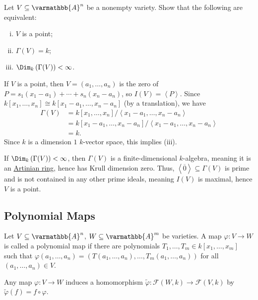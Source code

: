 \documentclass[10pt]{mypackage}
\renewcommand*{\mathbb}[1]{\varmathbb{#1}}
\newcommand{\A}{\mathbb{A}}
\begin{document}
\begin{exercise}[Exercise 2.4]
  Let $V\subseteq \A^n$ be a nonempty variety. Show that the following are equivalent:
  \begin{enumerate}[(i)]
    \item $V$ is a point;
    \item $\Gamma(V) = k$;
    \item $\Dim_{k}\left( \Gamma(V) \right) < \infty$.
  \end{enumerate}
\end{exercise}
\begin{solution}
  If $V$ is a point, then $V = \left( a_1,\dots,a_n \right)$ is the zero of $P = s_1\left( x_1-a_1 \right) + \cdots + s_n\left( x_n-a_n \right)$, so $I(V) = \left\langle P \right\rangle$. Since $k\left[ x_1,\dots,x_n \right] \cong k\left[ x_1-a_1,\dots,x_n-a_n \right]$ (by a translation), we have
  \begin{align*}
    \Gamma(V) &= k\left[ x_1,\dots,x_n \right]/\left\langle x_1-a_1,\dots,x_n-a_n \right\rangle\\
              &= k\left[ x_1-a_1,\dots,x_n-a_n \right]/\left\langle x_1-a_1,\dots,x_n-a_n \right\rangle\\
              &= k.
  \end{align*}
  Since $k$ is a dimension $1$ $k$-vector space, this implies (iii).\newline

  If $\Dim_{k}\left( \Gamma(V) \right) < \infty$, then $\Gamma(V)$ is a finite-dimensional $k$-algebra, meaning it is an \href{https://en.wikipedia.org/wiki/Artinian_ring}{Artinian ring}, hence has Krull dimension zero. Thus, $\left\langle \overline{0} \right\rangle\subseteq \Gamma(V)$ is prime and is not contained in any other prime ideals, meaning $I(V)$ is maximal, hence $V$ is a point.
\end{solution}
\subsection{Polynomial Maps}%
\begin{definition}
  Let $V\subseteq \A^n$, $W\subseteq \A^m$ be varieties. A map $\varphi\colon V\rightarrow W$ is called a polynomial map if there are polynomials $T_1,\dots,T_m\in k\left[ x_1,\dots,x_m \right]$ such that $\varphi\left( a_1,\dots,a_n \right) = \left( T\left( a_1,\dots,a_n \right),\dots,T_m\left( a_1,\dots,a_n \right) \right)$ for all $\left( a_1,\dots,a_n \right)\in V$.
\end{definition}
Any map $\varphi\colon V\rightarrow W$ induces a homomorphism $\widetilde{\varphi}\colon \mathcal{F}\left( W,k \right)\rightarrow \mathcal{F}\left( V,k \right)$ by $\widetilde{\varphi}\left( f \right) = f\circ\varphi$.\newline
\end{document}
